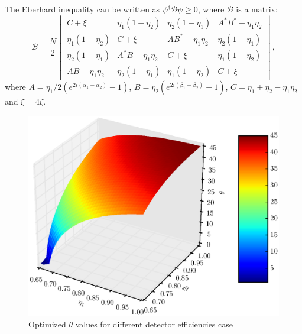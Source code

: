 \documentclass[%
master,         %
subf,           %
href,           %
colorlinks=true %
]{disser}
\numberwithin{equation}{section}
\numberwithin{figure}{section}
\begin{document}
The Eberhard inequality can be written as $\psi^\dagger\mathcal{B}\psi \geq 0$, where $\mathcal{B}$ is a matrix:
\[
\mathcal{B} = \dfrac{N}{2}
\begin{vmatrix}
C + \xi & \eta_1(1 - \eta_2) & \eta_2(1 - \eta_1) & A^*B^* - \eta_1\eta_2\\
\eta_1(1 - \eta_2) & C + \xi & AB^* - \eta_1\eta_2 & \eta_2(1 - \eta_1)\\
\eta_2(1 - \eta_1) & A^*B - \eta_1\eta_2 & C + \xi & \eta_1(1 - \eta_2)\\
AB - \eta_1\eta_2 & \eta_2(1 - \eta_1) & \eta_1(1 - \eta_2) & C + \xi
\end{vmatrix},
\]
where $A = \eta_1/2(e^{2i(\alpha_1-\alpha_2)} - 1)$, $B = \eta_2(e^{2i(\beta_1 - \beta_2)} -1)$, $C = \eta_1 + \eta_2 - \eta_1\eta_2$ and $\xi = 4\zeta$.

\begin{figure}[h]
\includegraphics[scale=0.7]{theta3d.eps}
\caption{Optimized $\theta$ values for different detector efficiencies case}
\label{fig:theta_opt_3d}
\end{figure}
\end{document}
